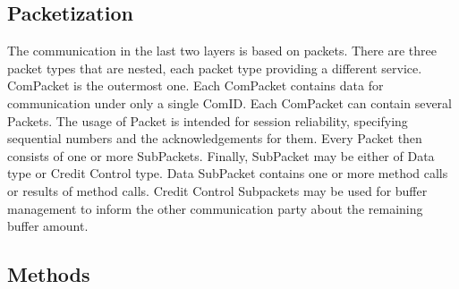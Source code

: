 \subsection{Packetization}

The communication in the last two layers is based on packets. There are three packet types that are nested, each packet type providing a different service.
ComPacket is the outermost one. Each ComPacket contains data for communication under only a single ComID. Each ComPacket can contain several Packets. The usage of Packet is intended for session reliability, specifying sequential numbers and the acknowledgements for them. Every Packet then consists of one or more SubPackets. Finally, SubPacket may be either of Data type or Credit Control type. Data SubPacket contains one or more method calls or results of method calls. Credit Control Subpackets may be used for buffer management to inform the other communication party about the remaining buffer amount.

\subsection{Methods}




